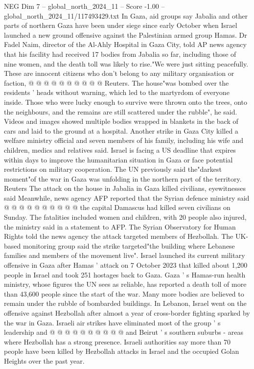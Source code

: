 \begin{textsample}{NEG Dim 7 – global\_north\_2024\_11 – Score -1.00 – global\_north\_2024\_11/117493429.txt}
In Gaza, aid groups say Jabalia and other parts of northern Gaza have been under siege since early October when Israel launched a new ground offensive against the Palestinian armed group Hamas.
Dr Fadel Naim, director of the Al-Ahly Hospital in Gaza City, told AP news agency that his facility had received 17 bodies from Jabalia so far, including those of nine women, and the death toll was likely to rise."We were just sitting peacefully.
These are innocent citizens who don't belong to any military organisation or faction, @ @ @ @ @ @ @ @ @ @ Reuters.
The house"was bombed over the residents ' heads without warning, which led to the martyrdom of everyone inside.
Those who were lucky enough to survive were thrown onto the trees, onto the neighbours, and the remains are still scattered under the rubble", he said.
Videos and images showed multiple bodies wrapped in blankets in the back of cars and laid to the ground at a hospital.
Another strike in Gaza City killed a welfare ministry official and seven members of his family, including his wife and children, medics and relatives said.
Israel is facing a US deadline that expires within days to improve the humanitarian situation in Gaza or face potential restrictions on military cooperation.
The UN previously said the"darkest moment"of the war in Gaza was unfolding in the northern part of the territory.
Reuters The attack on the house in Jabalia in Gaza killed civilians, eyewitnesses said Meanwhile, news agency AFP reported that the Syrian defence ministry said @ @ @ @ @ @ @ @ @ @ the capital Damascus had killed seven civilians on Sunday.
The fatalities included women and children, with 20 people also injured, the ministry said in a statement to AFP.
The Syrian Observatory for Human Rights told the news agency the attack targeted members of Hezbollah.
The UK-based monitoring group said the strike targeted"the building where Lebanese families and members of the movement live".
Israel launched its current military offensive in Gaza after Hamas ' attack on 7 October 2023 that killed about 1,200 people in Israel and took 251 hostages back to Gaza.
Gaza ' s Hamas-run health ministry, whose figures the UN sees as reliable, has reported a death toll of more than 43,600 people since the start of the war.
Many more bodies are believed to remain under the rubble of bombarded buildings.
In Lebanon, Israel went on the offensive against Hezbollah after almost a year of cross-border fighting sparked by the war in Gaza.
Israeli air strikes have eliminated most of the group ' s leadership and @ @ @ @ @ @ @ @ @ @ and Beirut ' s southern suburbs - areas where Hezbollah has a strong presence.
Israeli authorities say more than 70 people have been killed by Hezbollah attacks in Israel and the occupied Golan Heights over the past year.

\end{textsample}
